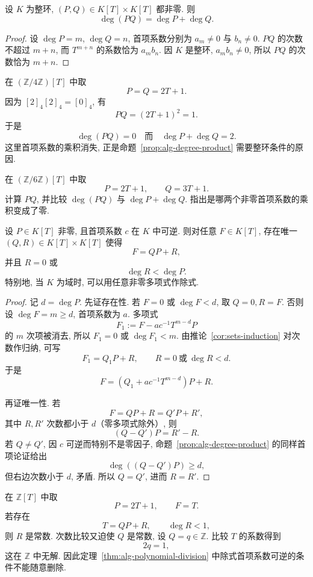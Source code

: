 \documentclass[usesamecnt, thmcnt=section, lang=cn, newtx, 10pt, scheme=chinese]{elegantbook}
\begin{document}
\begin{proposition}\label{prop:alg-degree-product}
设 $K$ 为整环, $(P,Q)\in K[T]\times K[T]$ 都非零. 则
\[
 \deg(PQ)=\deg P+\deg Q.
\]
\end{proposition}

\begin{proof}
设 $\deg P=m$, $\deg Q=n$, 首项系数分别为 $a_m\neq0$ 与 $b_n\neq0$. $PQ$ 的次数不超过 $m+n$, 而 $T^{m+n}$ 的系数恰为 $a_mb_n$. 因 $K$ 是整环, $a_mb_n\neq0$, 所以 $PQ$ 的次数恰为 $m+n$.
\end{proof}

\begin{instance}
在 $(\mathbb Z/4\mathbb Z)[T]$ 中取
\[
 P=Q=2T+1.
\]
因为 $[2]_4[2]_4=[0]_4$, 有
\[
 PQ=(2T+1)^2=1.
\]
于是
\[
 \deg(PQ)=0
 \quad\text{而}\quad
 \deg P+\deg Q=2.
\]
这里首项系数的乘积消失, 正是命题~\ref{prop:alg-degree-product} 需要整环条件的原因.
\end{instance}

\begin{exercise}\label{ex:alg-degree-domain}
在 $(\mathbb Z/6\mathbb Z)[T]$ 中取
\[
 P=2T+1,\qquad Q=3T+1.
\]
计算 $PQ$, 并比较 $\deg(PQ)$ 与 $\deg P+\deg Q$. 指出是哪两个非零首项系数的乘积变成了零.
\end{exercise}

\begin{theorem}\label{thm:alg-polynomial-division}
设 $P\in K[T]$ 非零, 且首项系数 $c$ 在 $K$ 中可逆. 则对任意 $F\in K[T]$, 存在唯一 $(Q,R)\in K[T]\times K[T]$ 使得
\[
 F=QP+R,
\]
并且 $R=0$ 或
\[
 \deg R<\deg P.
\]
特别地, 当 $K$ 为域时, 可以用任意非零多项式作除式.
\end{theorem}

\begin{proof}
记 $d=\deg P$. 先证存在性. 若 $F=0$ 或 $\deg F<d$, 取 $Q=0,R=F$. 否则设 $\deg F=m\geq d$, 首项系数为 $a$. 多项式
\[
 F_1:=F-ac^{-1}T^{m-d}P
\]
的 $m$ 次项被消去, 所以 $F_1=0$ 或 $\deg F_1<m$. 由推论~\ref{cor:sets-induction} 对次数作归纳, 可写
\[
 F_1=Q_1P+R,
 \qquad R=0\ \text{或}\ \deg R<d.
\]
于是
\[
 F=(Q_1+ac^{-1}T^{m-d})P+R.
\]

再证唯一性. 若
\[
 F=QP+R=Q'P+R',
\]
其中 $R,R'$ 次数都小于 $d$（零多项式除外）, 则
\[
 (Q-Q')P=R'-R.
\]
若 $Q\neq Q'$, 因 $c$ 可逆而特别不是零因子, 命题~\ref{prop:alg-degree-product} 的同样首项论证给出
\[
 \deg((Q-Q')P)\geq d,
\]
但右边次数小于 $d$, 矛盾. 所以 $Q=Q'$, 进而 $R=R'$.
\end{proof}

\begin{instance}
在 $\mathbb Z[T]$ 中取
\[
 P=2T+1,\qquad F=T.
\]
若存在
\[
 T=QP+R,\qquad \deg R<1,
\]
则 $R$ 是常数. 次数比较又迫使 $Q$ 是常数, 设 $Q=q\in\mathbb Z$. 比较 $T$ 的系数得到
\[
 2q=1,
\]
这在 $\mathbb Z$ 中无解. 因此定理~\ref{thm:alg-polynomial-division} 中除式首项系数可逆的条件不能随意删除.
\end{instance}
\end{document}
